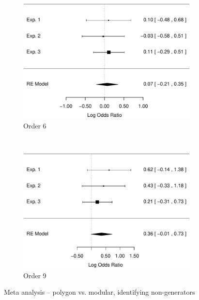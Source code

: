 \documentclass[man,10pt]{apa6}
\begin{document}
\begin{figure}
\centering
\begin{subfigure}[c]{0.4\textwidth}
\centering
\includegraphics[width=\textwidth]{figures/meta/question_typegenerator_false_6_conditionpolygon.pdf}
\caption{Order 6}
\end{subfigure}
~
\begin{subfigure}[c]{0.4\textwidth}
\centering
\includegraphics[width=\textwidth]{figures/meta/question_typegenerator_false_9_conditionpolygon.pdf}
\caption{Order 9}
\end{subfigure}
\caption{Meta analysis -- polygon vs. modular, identifying non-generators}
\label{meta_genF_p}
\end{figure}\noindent 
\end{document}

